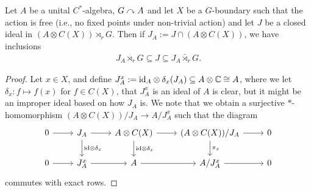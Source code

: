 \begin{proposition}
	Let $A$ be a unital $C^*$-algebra, $G \stackrel{}{\curvearrowright} {A}$ and let $X$ be a $G$-boundary such that the action is free (i.e., no fixed points under non-trivial action) and let $J$ be a closed ideal in $(A \otimes C(X)) \rtimes_r G$. Then if $J_A := J \cap (A \otimes C(X))$, we have inclusions
	\begin{align*}
		 J_A \rtimes_r G \subseteq J \subseteq J_A \bar \rtimes_r G.
	\end{align*}
\end{proposition}
\begin{proof}
	Let $x \in X$, and define $J_A^x := \mathrm{id}_A \otimes \delta_x(J_A) \subseteq A \otimes \mathbb{C} \cong A$, where we let $\delta_x \colon f \mapsto f(x)$ for $f \in C(X)$, that $J_A^x$ is an ideal of $A$ is clear, but it might be an improper ideal based on how $J_A$ is. We note that we obtain a surjective $*$-homomorphism $(A \otimes C(X)) / J_A \to A / J_A^x$ such that the diagram
	\begin{equation*}
		\begin{tikzcd}
			0 \ar[r] & J_A \ar[r] \ar[d, "\mathrm{id}\otimes \delta_x"] & A \otimes C(X) \ar[d, "\mathrm{id}\otimes \delta_x"] \ar[r] &(A \otimes C(X)) /J_A \ar[r] \ar[d, "\pi_x"] & 0\\
			0 \ar[r] & J_A^x \ar[r] & A \ar[r] & A/J_A^x \ar[r] & 0
		\end{tikzcd}
	\end{equation*}
	commutes with exact rows.
\end{proof}

